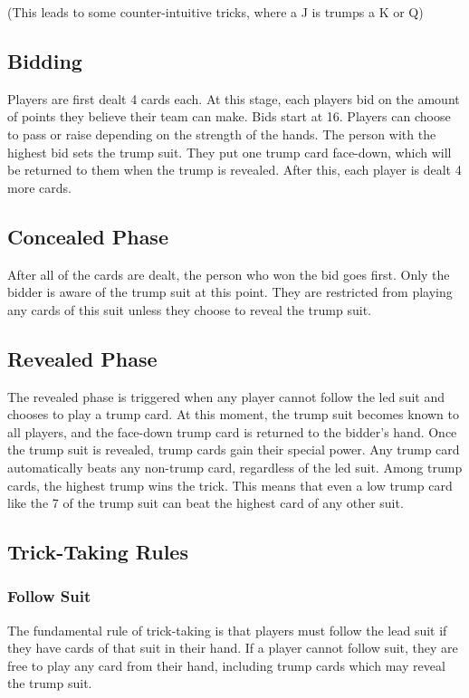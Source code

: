 \documentclass[conference]{IEEEtran}
\begin{document}
(This leads to some counter-intuitive tricks, where a J is trumps a K or Q)

\subsection{Bidding}
Players are first dealt 4 cards each. At this stage, each players bid on the amount of points they believe their team can make. Bids start at 16. Players can choose to pass or raise depending on the strength of the hands. The person with the highest bid sets the trump suit. They put one trump card face-down, which will be returned to them when the trump is revealed. After this, each player is dealt 4 more cards.

\subsection{Concealed Phase}
After all of the cards are dealt, the person who won the bid goes first. Only the bidder is aware of the trump suit at this point. They are restricted from playing any cards of this suit unless they choose to reveal the trump suit. 

\subsection{Revealed Phase}
The revealed phase is triggered when any player cannot follow the led suit and chooses to play a trump card. At this moment, the trump suit becomes known to all players, and the face-down trump card is returned to the bidder's hand. Once the trump suit is revealed, trump cards gain their special power. Any trump card automatically beats any non-trump card, regardless of the led suit. Among trump cards, the highest trump wins the trick. This means that even a low trump card like the 7 of the trump suit can beat the highest card of any other suit. 

\subsection{Trick-Taking Rules}

\subsubsection{Follow Suit}
The fundamental rule of trick-taking is that players must follow the lead suit if they have cards of that suit in their hand. If a player cannot follow suit, they are free to play any card from their hand, including trump cards which may reveal the trump suit. 
\end{document}
